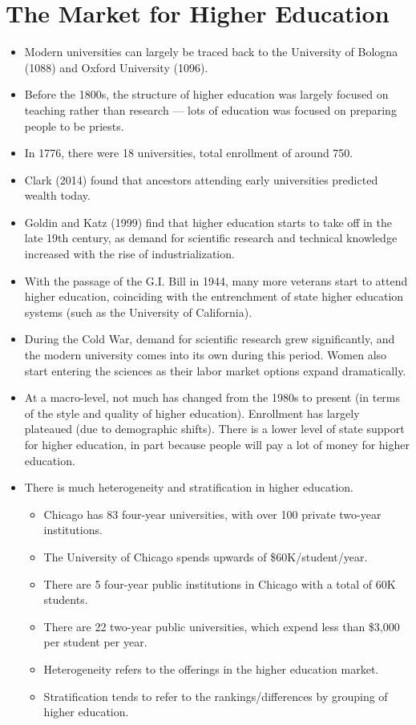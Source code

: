 \documentclass[10pt]{extarticle}
\begin{document}
  \section{The Market for Higher Education}%
  \begin{itemize}
    \item Modern universities can largely be traced back to the University of Bologna (1088) and Oxford University (1096).
    \item Before the 1800s, the structure of higher education was largely focused on teaching rather than research --- lots of education was focused on preparing people to be priests.
    \item In 1776, there were 18 universities, total enrollment of around 750.
    \item Clark (2014) found that ancestors attending early universities predicted wealth today.
    \item Goldin and Katz (1999) find that higher education starts to take off in the late 19th century, as demand for scientific research and technical knowledge increased with the rise of industrialization.
    \item With the passage of the G.I. Bill in 1944, many more veterans start to attend higher education, coinciding with the entrenchment of state higher education systems (such as the University of California).
    \item During the Cold War, demand for scientific research grew significantly, and the modern university comes into its own during this period. Women also start entering the sciences as their labor market options expand dramatically.
    \item At a macro-level, not much has changed from the 1980s to present (in terms of the style and quality of higher education). Enrollment has largely plateaued (due to demographic shifts). There is a lower level of state support for higher education, in part because people will pay a lot of money for higher education.
    \item There is much heterogeneity and stratification in higher education.
      \begin{itemize}
        \item Chicago has 83 four-year universities, with over 100 private two-year institutions.
        \item The University of Chicago spends upwards of \$60K/student/year.
        \item There are 5 four-year public institutions in Chicago with a total of 60K students.
        \item There are 22 two-year public universities, which expend less than \$3,000 per student per year.
        \item Heterogeneity refers to the offerings in the higher education market.
        \item Stratification tends to refer to the rankings/differences by grouping of higher education.
      \end{itemize}
  \end{itemize}
\end{document}

